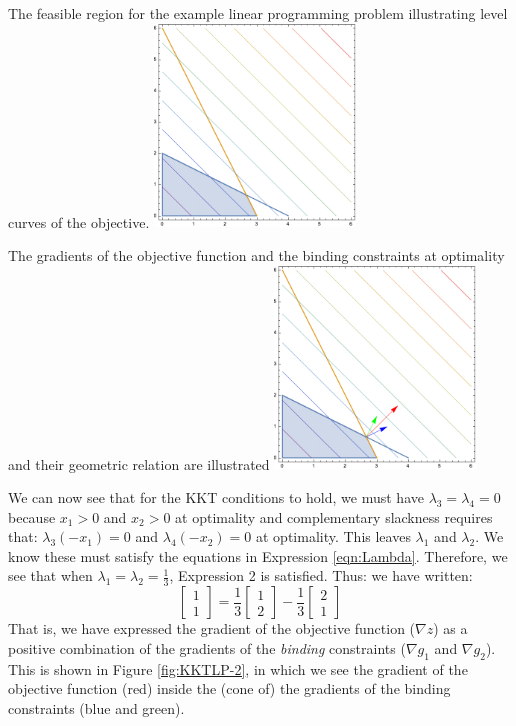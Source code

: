 \begin{FigureCenter}{The feasible region for the example linear programming problem illustrating level curves of the objective.}
    \label{fig:KKTLP-1}
    \includegraphics[width=0.4\textwidth]{imported_figures/KKTLP-1-eps-converted-to.pdf}
\end{FigureCenter}

\begin{FigureCenter}{The gradients of the objective function and the binding constraints at optimality and their geometric relation are illustrated}
    \label{fig:KKTLP-2}
    \includegraphics[width=0.4\textwidth]{imported_figures/KKTLP-2-eps-converted-to.pdf}
\end{FigureCenter}


We can now see that for the KKT conditions to hold, we must have $\lambda_3 = \lambda_4 = 0$ because $x_1 > 0$ and $x_2 > 0$ at optimality and complementary slackness requires that: $\lambda_3(-x_1) = 0$ and $\lambda_4(-x_2) = 0$ at optimality. This leaves $\lambda_1$ and $\lambda_2$. We know these must satisfy the equations in Expression \ref{eqn:Lambda}. Therefore, we see that when $\lambda_1 = \lambda_2 = \tfrac{1}{3}$, Expression 2 is satisfied. Thus: we have written:
\begin{equation}
\begin{bmatrix}1\\1\end{bmatrix} = \frac{1}{3}\begin{bmatrix}1\\2\end{bmatrix} - 
\frac{1}{3}\begin{bmatrix}2\\1\end{bmatrix}
\end{equation}
That is, we have expressed the gradient of the objective function ($\nabla z$) as a positive combination of the gradients of the \textit{binding} constraints ($\nabla g_1$ and $\nabla g_2$). This is shown in Figure \ref{fig:KKTLP-2}, in which we see the gradient of the objective function (red) inside the (cone of) the gradients of the binding constraints (blue and green).

